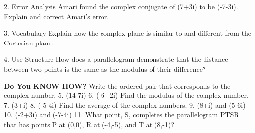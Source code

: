 \documentclass{article}
\newenvironment{concept-summary}{}{}    %
\newcommand{\answer}[1]{}               %
\newcommand{\te}[1]{}                   %
\begin{document}
\begin{concept-summary}
2. Error Analysis Amari found the complex conjugate of (7+3i) to be (-7-3i). Explain and correct Amari's error.
\answer{To find a complex conjugate, reflect over the real x-axis. Reflecting over the real x-axis affects only the y-coordinate, or the imaginary part of the complex number. Casey took the opposite of both parts of the complex number. The complex conjugate of (7+3i) is (7-3i).}
\te{Printed answer calls the student Casey; likely Amari as in the prompt.}
3. Vocabulary Explain how the complex plane is similar to and different from the Cartesian plane.
\answer{The complex plane and the standard xy-plane both have two axes. Instead of the standard x- and y-axes, the complex plane has real (horizontal) and imaginary (vertical) axes.}
4. Use Structure How does a parallelogram demonstrate that the distance between two points is the same as the modulus of their difference?
\answer{Opposite sides of a parallelogram are congruent. The side formed by the two points and the side that is the modulus of the difference are opposite sides when graphed as a parallelogram, so they must be the same length.}
\textbf{Do You KNOW HOW?}
Write the ordered pair that corresponds to the complex number.
5. (14-7i) \answer{(14,-7)}
6. (-6+2i) \answer{(-6,2)}
Find the modulus of the complex number.
7. (3+i) \answer{(\sqrt{10})}
8. (-5-4i) \answer{(\sqrt{41})}
Find the average of the complex numbers.
9. (8+i) and (5-6i) \answer{(6.5-2.5i)}
10. (-2+3i) and (-7-4i) \answer{(-4.5-0.5i)}
11. What point, S, completes the parallelogram PTSR that has points P at (0,0), R at (-4,-5), and T at (8,-1)?
\answer{(4,-6)}
\end{concept-summary}
\end{document}
